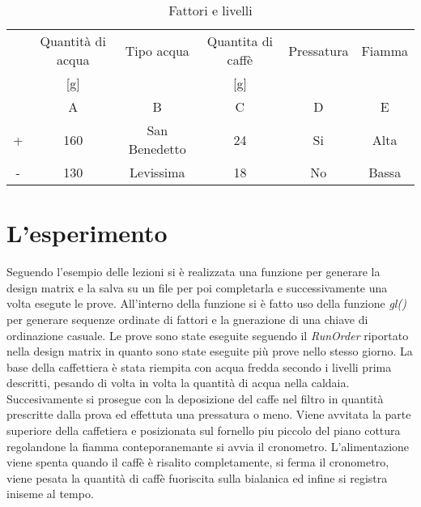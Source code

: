 \begin{table}[htb]
  \caption{Fattori e livelli}
  \label{tab:factorLvl}
  \begin{tabular}{cccccc}
    \hline
    & Quantità di acqua & Tipo acqua & Quantita di caffè & Pressatura & Fiamma\\
    & [g] &  & [g] &  & \\
    \hline
    & A &B&C&D&E\\
    \hline
  + & 160 & San Benedetto & 24 & Si & Alta\\
  - & 130 & Levissima & 18 & No & Bassa\\
  \hline
  \end{tabular}
\end{table}

\section{L'esperimento}
Seguendo l'esempio delle lezioni si è realizzata una funzione per generare la design matrix  e la salva su un file per poi completarla e successivamente una volta esegute le prove.
All'interno della funzione si è fatto uso della funzione \emph{gl()} per generare sequenze ordinate di fattori e la gnerazione di una chiave di ordinazione casuale.
Le prove sono state eseguite seguendo il \emph{RunOrder} riportato nella design matrix in quanto sono state eseguite più prove nello stesso giorno.
La base della caffettiera è stata riempita con acqua fredda secondo i livelli prima descritti, pesando di volta in volta la quantità di acqua nella caldaia. Succesivamente si prosegue con la deposizione del caffe nel filtro in quantità prescritte dalla prova ed effettuta una pressatura o meno. Viene avvitata la parte superiore della caffetiera e posizionata sul fornello piu piccolo del piano cottura regolandone la fiamma conteporanemante si avvia il cronometro.
L'alimentazione viene spenta quando il caffè è risalito completamente, si ferma il cronometro, viene pesata la quantità di caffè fuoriscita sulla bialanica ed infine si registra iniseme al tempo.
